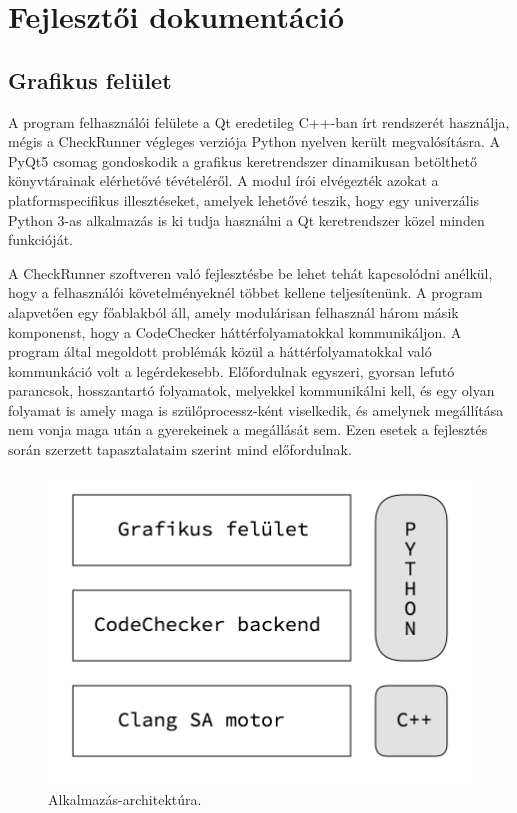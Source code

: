\documentclass[a4paper,12pt]{report}
\begin{document}
\chapter{Fejlesztői dokumentáció}

\section{Grafikus felület}
A program felhasználói felülete a Qt eredetileg C++-ban írt rendszerét használja, mégis a CheckRunner végleges verziója Python nyelven került megvalósításra. A PyQt5 csomag gondoskodik a grafikus keretrendszer dinamikusan betölthető könyvtárainak elérhetővé tévételéről. A modul írói elvégezték azokat a platformspecifikus illesztéseket, amelyek lehetővé teszik, hogy egy univerzális Python 3-as alkalmazás is ki tudja használni a Qt keretrendszer közel minden funkcióját.

A CheckRunner szoftveren való fejlesztésbe be lehet tehát kapcsolódni anélkül, hogy a felhasználói követelményeknél többet kellene teljesítenünk. A program alapvetően egy főablakból áll, amely modulárisan felhasznál három másik komponenst, hogy a CodeChecker háttérfolyamatokkal kommunikáljon. A program által megoldott problémák közül a háttérfolyamatokkal való kommunkáció volt a legérdekesebb. Előfordulnak egyszeri, gyorsan lefutó parancsok, hosszantartó folyamatok, melyekkel kommunikálni kell, és egy olyan folyamat is amely maga is szülőprocessz-ként viselkedik, és amelynek megállítása nem vonja maga után a gyerekeinek a megállását sem. Ezen esetek a fejlesztés során szerzett tapasztalataim szerint mind előfordulnak.

\begin{figure}[h]
\caption{Alkalmazás-architektúra.}
\centering
\includegraphics[scale=0.4]{architektura.png}
\end{figure}
\end{document}
